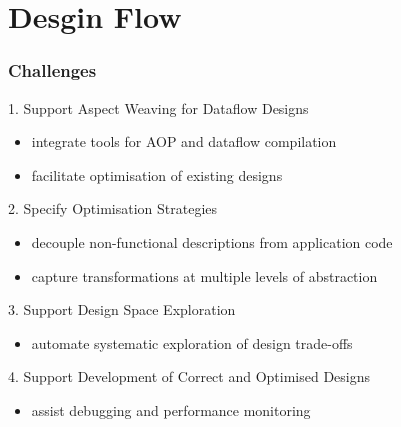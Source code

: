 \section{Desgin Flow}
\begin{frame}
  \frametitle{Challenges}

  \begin{beamerboxesrounded}{1. Support Aspect Weaving for Dataflow Designs}
    \begin{itemize}
    \item integrate tools for AOP and dataflow compilation
    \item facilitate optimisation of existing designs
    \end{itemize}
  \end{beamerboxesrounded}

  \begin{beamerboxesrounded}{2. Specify Optimisation Strategies}
    \begin{itemize}
    \item decouple non-functional descriptions from application code
    \item capture transformations at multiple levels of abstraction
    \end{itemize}
  \end{beamerboxesrounded}

  \begin{beamerboxesrounded}{3. Support Design Space Exploration}
    \begin{itemize}
    \item automate systematic exploration of design trade-offs
    \end{itemize}
  \end{beamerboxesrounded}
  \begin{beamerboxesrounded}{4. Support Development of Correct and Optimised Designs}
    \begin{itemize}
    \item assist debugging and performance monitoring
    \end{itemize}
  \end{beamerboxesrounded}
\end{frame}

